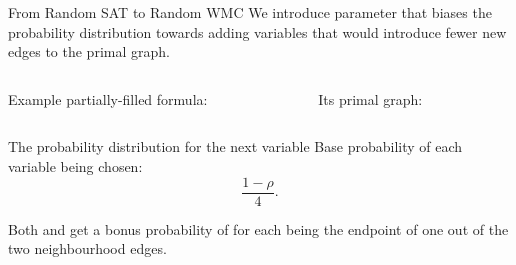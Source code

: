 \documentclass{beamer}
\begin{document}
\begin{frame}{From Random SAT to Random WMC}
  We introduce parameter \structure{$\rho \in [0, 1]$} that biases the
  probability distribution towards adding variables that would introduce fewer
  new edges to the primal graph.

  \vfill
  \begin{columns}[t]
    \begin{column}{0.5\linewidth}
      Example partially-filled formula:
    \end{column}
    \begin{column}{0.4\linewidth}
      Its primal graph:

    \end{column}
  \end{columns}

  \begin{block}{The probability distribution for the next variable}
    Base probability of each variable being chosen:
    \[
      \frac{1 - \rho}{4}.
    \]

    Both  and  get a bonus probability of
     for each being the endpoint of \alert{one} out of
    the \alert{two} neighbourhood edges.
  \end{block}
\end{frame}
\end{document}
